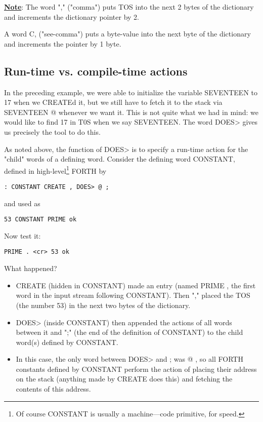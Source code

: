 \underline{\textbf{Note}}: The word "," ("comma") puts TOS into the next 2 bytes of the dictionary and increments the dictionary pointer by 2.

A word C, ("see-comma") puts a byte-value into the next byte of the dictionary and increments the pointer by 1 byte.

\subsection{Run-time vs. compile-time actions}

In the preceding example, we were able to initialize the variable SEVENTEEN to 17 when we CREATEd it, but we still have to fetch it to the stack via SEVENTEEN @ whenever we want it. This is not quite what we had in mind: we would like to find 17 in T0S when we say SEVENTEEN. The word DOES> gives us precisely the tool to do this.

As noted above, the function of DOES> is to specify a run-time action for the "child" words of a defining word. Consider the defining word CONSTANT, defined in high-level\footnote{Of course CONSTANT is usually a machine—code primitive, for speed.} FORTH by

\begin{lstlisting}
: CONSTANT CREATE , DOES> @ ;
\end{lstlisting}
and used as
\begin{lstlisting}
53 CONSTANT PRIME ok
\end{lstlisting}

Now test it:
\begin{lstlisting}
PRIME . <cr> 53 ok
\end{lstlisting}

What happened?
\begin{itemize}
    \item CREATE (hidden in CONSTANT) made an entry (named PRIME , the first word in the input stream following CONSTANT). Then "," placed the TOS (the number 53) in the next two bytes of the dictionary.
    \item DOES> (inside CONSTANT) then appended the actions of all words between it and ";" (the end of the definition of CONSTANT) to the child word(s) defined by CONSTANT.
    \item In this case, the only word between DOES> and ; was @ , so all FORTH constants defined by CONSTANT perform the action of placing their address on the stack (anything made by CREATE does this) and fetching the contents of this address.
\end{itemize}

